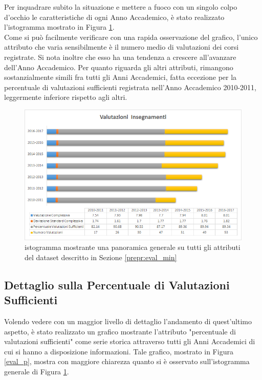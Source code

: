     Per inquadrare subito la situazione e mettere a fuoco con un singolo colpo d'occhio le caratteristiche di ogni Anno Accademico, è stato realizzato l'istogramma mostrato in Figura \ref{eval_gen}. \\

    Come si può facilmente verificare con una rapida osservazione del grafico, l'unico attributo che varia sensibilmente è il numero medio di valutazioni dei corsi registrate. Si nota inoltre che esso ha una tendenza a crescere all'avanzare dell'Anno Accademico. Per quanto riguarda gli altri attributi, rimangono sostanzialmente simili fra tutti gli Anni Accademici, fatta eccezione per la percentuale di valutazioni sufficienti registrata nell'Anno Accademico 2010-2011, leggermente inferiore rispetto agli altri. \\

    \begin{figure}
        \centering
        \caption{istogramma mostrante una panoramica generale su tutti gli attributi del dataset descritto in Sezione \ref{prepr:eval_min}}
        \label{eval_gen}
        \includegraphics[scale=0.55]{../visual/eval_3.png}
    \end{figure}

    \subsection{Dettaglio sulla Percentuale di Valutazioni Sufficienti}

    Volendo vedere con un maggior livello di dettaglio l'andamento di quest'ultimo aspetto, è stato realizzato un grafico mostrante l'attributo "percentuale di valutazioni sufficienti" come serie storica attraverso tutti gli Anni Accademici di cui si hanno a disposizione informazioni. Tale grafico, mostrato in Figura \ref{eval_p}, mostra con maggiore chiarezza quanto si è osservato sull'istogramma generale di Figura \ref{eval_gen}. \\

